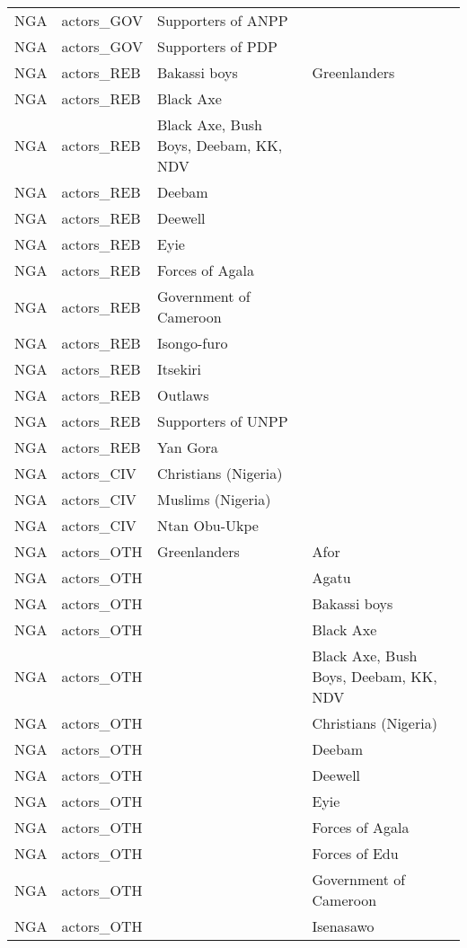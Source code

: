 \begin{table}[ht]
\begin{tabular}{llll}
  NGA & actors\_GOV & Supporters of ANPP &  \\ 
  NGA & actors\_GOV & Supporters of PDP &  \\ 
  NGA & actors\_REB & Bakassi boys & Greenlanders \\ 
  NGA & actors\_REB & Black Axe &  \\ 
  NGA & actors\_REB & Black Axe, Bush Boys, Deebam, KK, NDV &  \\ 
  NGA & actors\_REB & Deebam &  \\ 
  NGA & actors\_REB & Deewell &  \\ 
  NGA & actors\_REB & Eyie &  \\ 
  NGA & actors\_REB & Forces of Agala &  \\ 
  NGA & actors\_REB & Government of Cameroon &  \\ 
  NGA & actors\_REB & Isongo-furo &  \\ 
  NGA & actors\_REB & Itsekiri &  \\ 
  NGA & actors\_REB & Outlaws &  \\ 
  NGA & actors\_REB & Supporters of UNPP &  \\ 
  NGA & actors\_REB & Yan Gora &  \\ 
  NGA & actors\_CIV & Christians (Nigeria) &  \\ 
  NGA & actors\_CIV & Muslims (Nigeria) &  \\ 
  NGA & actors\_CIV & Ntan Obu-Ukpe &  \\ 
  NGA & actors\_OTH & Greenlanders & Afor \\ 
  NGA & actors\_OTH &  & Agatu \\ 
  NGA & actors\_OTH &  & Bakassi boys \\ 
  NGA & actors\_OTH &  & Black Axe \\ 
  NGA & actors\_OTH &  & Black Axe, Bush Boys, Deebam, KK, NDV \\ 
  NGA & actors\_OTH &  & Christians (Nigeria) \\ 
  NGA & actors\_OTH &  & Deebam \\ 
  NGA & actors\_OTH &  & Deewell \\ 
  NGA & actors\_OTH &  & Eyie \\ 
  NGA & actors\_OTH &  & Forces of Agala \\ 
  NGA & actors\_OTH &  & Forces of Edu \\ 
  NGA & actors\_OTH &  & Government of Cameroon \\ 
  NGA & actors\_OTH &  & Isenasawo \\ 

\end{tabular}
\end{table}
